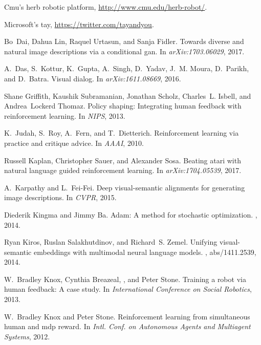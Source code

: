 \documentclass{article}
\begin{document}
\begin{thebibliography}{10}

Cmu's herb robotic platform, \url{http://www.cmu.edu/herb-robot/}.

Microsoft's tay, \url{https://twitter.com/tayandyou}.

Bo~Dai, Dahua Lin, Raquel Urtasun, and Sanja Fidler.
\newblock Towards diverse and natural image descriptions via a conditional gan.
\newblock In {\em arXiv:1703.06029}, 2017.

A.~Das, S.~Kottur, K.~Gupta, A.~Singh, D.~Yadav, J.~M. Moura, D.~Parikh, and
  D.~Batra.
\newblock Visual dialog.
\newblock In {\em arXiv:1611.08669}, 2016.

Shane Griffith, Kaushik Subramanian, Jonathan Scholz, Charles~L. Isbell, and
  Andrea~Lockerd Thomaz.
\newblock Policy shaping: Integrating human feedback with reinforcement
  learning.
\newblock In {\em NIPS}, 2013.

K.~Judah, S.~Roy, A.~Fern, and T.~Dietterich.
\newblock Reinforcement learning via practice and critique advice.
\newblock In {\em AAAI}, 2010.

Russell Kaplan, Christopher Sauer, and Alexander Sosa.
\newblock Beating atari with natural language guided reinforcement learning.
\newblock In {\em arXiv:1704.05539}, 2017.

A.~Karpathy and L.~Fei-Fei.
\newblock Deep visual-semantic alignments for generating image descriptions.
\newblock In {\em CVPR}, 2015.

Diederik Kingma and Jimmy Ba.
\newblock Adam: A method for stochastic optimization.
, 2014.

Ryan Kiros, Ruslan Salakhutdinov, and Richard~S. Zemel.
\newblock Unifying visual-semantic embeddings with multimodal neural language
  models.
, abs/1411.2539, 2014.

W.~Bradley Knox, Cynthia Breazeal, , and Peter Stone.
\newblock Training a robot via human feedback: A case study.
\newblock In {\em International Conference on Social Robotics}, 2013.

W.~Bradley Knox and Peter Stone.
\newblock Reinforcement learning from simultaneous human and mdp reward.
\newblock In {\em Intl. Conf. on Autonomous Agents and Multiagent Systems},
  2012.


\end{thebibliography}
\end{document}
